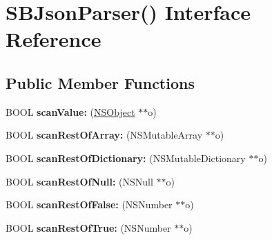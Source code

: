 \hypertarget{interface_s_b_json_parser_07_08}{
\section{\-S\-B\-Json\-Parser() \-Interface \-Reference}
\label{interface_s_b_json_parser_07_08}
}
\subsection*{\-Public \-Member \-Functions}
\begin{DoxyCompactItemize}
\item 
\hypertarget{interface_s_b_json_parser_07_08_ac636e0452108eb160cef77b66e912b0a}{
\-B\-O\-O\-L {\bfseries scan\-Value\-:} (\hyperlink{class_n_s_object}{\-N\-S\-Object} $\ast$$\ast$o)}
\label{interface_s_b_json_parser_07_08_ac636e0452108eb160cef77b66e912b0a}

\item 
\hypertarget{interface_s_b_json_parser_07_08_a081c4ee408752efed7e907d9f9c2d4ca}{
\-B\-O\-O\-L {\bfseries scan\-Rest\-Of\-Array\-:} (\-N\-S\-Mutable\-Array $\ast$$\ast$o)}
\label{interface_s_b_json_parser_07_08_a081c4ee408752efed7e907d9f9c2d4ca}

\item 
\hypertarget{interface_s_b_json_parser_07_08_a3de09621653a0a1cd940f227d043bacb}{
\-B\-O\-O\-L {\bfseries scan\-Rest\-Of\-Dictionary\-:} (\-N\-S\-Mutable\-Dictionary $\ast$$\ast$o)}
\label{interface_s_b_json_parser_07_08_a3de09621653a0a1cd940f227d043bacb}

\item 
\hypertarget{interface_s_b_json_parser_07_08_aeea34f47e63b11e406fa6a7b96108190}{
\-B\-O\-O\-L {\bfseries scan\-Rest\-Of\-Null\-:} (\-N\-S\-Null $\ast$$\ast$o)}
\label{interface_s_b_json_parser_07_08_aeea34f47e63b11e406fa6a7b96108190}

\item 
\hypertarget{interface_s_b_json_parser_07_08_a9b7107e91b570bcb02fb42d1003ead3b}{
\-B\-O\-O\-L {\bfseries scan\-Rest\-Of\-False\-:} (\-N\-S\-Number $\ast$$\ast$o)}
\label{interface_s_b_json_parser_07_08_a9b7107e91b570bcb02fb42d1003ead3b}

\item 
\hypertarget{interface_s_b_json_parser_07_08_a246c0a820e6fd69db1bbe79167c578c6}{
\-B\-O\-O\-L {\bfseries scan\-Rest\-Of\-True\-:} (\-N\-S\-Number $\ast$$\ast$o)}
\label{interface_s_b_json_parser_07_08_a246c0a820e6fd69db1bbe79167c578c6}


\end{DoxyCompactItemize}
